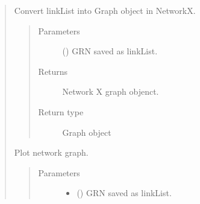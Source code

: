 \documentclass[letterpaper,10pt,english]{sphinxmanual}
\begin{document}
\begin{quote}
\begin{fulllineitems}
\begin{quote}
\begin{description}
\begin{itemize}
\end{itemize}

\end{description}\end{quote}

\end{fulllineitems}


\begin{fulllineitems}
\label{\detokenize{modules/celloracle.network_analysis:celloracle.network_analysis.linkList_to_networkgraph}}
Convert linkList into Graph object in NetworkX.
\begin{quote}\begin{description}
\item[{Parameters}] \leavevmode
{} () \textendash{} GRN saved as linkList.

\item[{Returns}] \leavevmode
Network X graph objenct.

\item[{Return type}] \leavevmode
Graph object

\end{description}\end{quote}

\end{fulllineitems}


\begin{fulllineitems}
\label{\detokenize{modules/celloracle.network_analysis:celloracle.network_analysis.draw_network}}
Plot network graph.
\begin{quote}\begin{description}
\item[{Parameters}] \leavevmode\begin{itemize}
\item {} 
 () \textendash{} GRN saved as linkList.


\end{itemize}
\end{description}
\end{quote}
\end{fulllineitems}
\end{quote}
\end{document}
